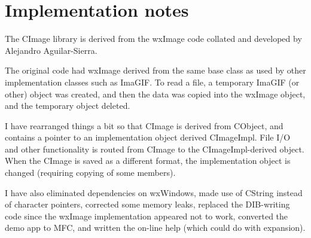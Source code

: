 \chapter{Implementation notes}\label{implement}
%
\setfooter{\thepage}{}{}{}{}{\thepage}%

The CImage library is derived from the wxImage code collated and
developed by Alejandro Aguilar-Sierra.

The original code had wxImage derived from the same base class
as used by other implementation classes such as ImaGIF. To read a file,
a temporary ImaGIF (or other) object was created, and then the data was
copied into the wxImage object, and the temporary object deleted.

I have rearranged things a bit so that CImage is derived from CObject,
and contains a pointer to an implementation object derived CImageImpl.
File I/O and other functionality is routed from CImage to the CImageImpl-derived
object. When the CImage is saved as a different format, the implementation
object is changed (requiring copying of some members).

I have also eliminated dependencies on wxWindows, made use of CString
instead of character pointers, corrected some memory leaks, replaced the
DIB-writing code since the wxImage implementation appeared not to work,
converted the demo app to MFC, and written the on-line help (which could
do with expansion).

